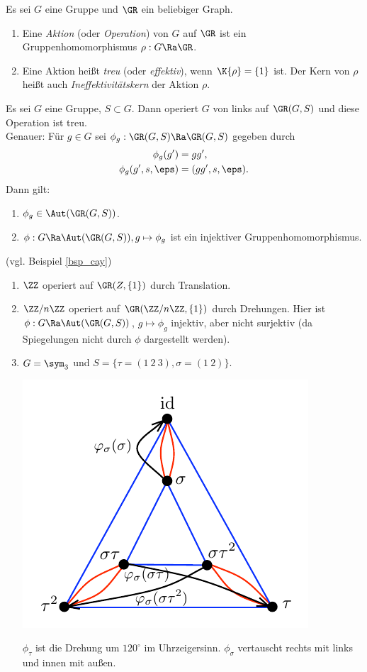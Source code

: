 \DB Es sei $G$ eine Gruppe und $\GR$ ein beliebiger Graph.
\begin{enumerate}
\item Eine \emph{Aktion} (oder \emph{Operation}) von $G$ auf $\GR$ ist ein
Gruppenhomomorphismus $\rho:G\Ra\GR$.
\item Eine Aktion heißt \emph{treu}
(oder \emph{effektiv}),
wenn $\K{\rho}=\{1\}$ ist. Der Kern von $\rho$ heißt auch
\emph{Ineffektivitätskern}
der Aktion $\rho$.
\end{enumerate}

\BEM Es sei $G$ eine Gruppe, $S\subset G$. Dann operiert $G$ von
links auf $\GR(G,S)$ und diese Operation ist treu.\\
Genauer: Für $g\in G$ sei $\phi_g:\GR(G,S)\Ra\GR(G,S)$ gegeben durch
\begin{align*}
\phi_g(g') &= gg', \\
\phi_g(g',s,\eps) &= (gg',s,\eps).
\end{align*}
Dann gilt:
\begin{enumerate}
\item $\phi_g \in \Aut(\GR(G,S))$.
\item $\phi:G\Ra\Aut(\GR(G,S)), g\mapsto \phi_g$ ist ein injektiver
Gruppenhomomorphismus.
\end{enumerate}

\BSP (vgl. Beispiel \ref{bsp_cay})
\begin{enumerate}
\item $\ZZ$ operiert auf $\GR(Z,\{1\})$ durch Translation.
\item $\ZZ/n\ZZ$ operiert auf $\GR(\ZZ/n\ZZ,\{1\})$ durch
Drehungen. Hier ist $\phi:G\Ra\Aut(\GR(G,S))$, $g\mapsto\phi_g$
injektiv, aber nicht surjektiv (da Spiegelungen nicht durch
$\phi$ dargestellt werden).
\item $G=\sym_3$ und $S=\{\tau=(1\ 2\ 3), \sigma=(1\ 2)\}$.
\begin{center}
	\includegraphics{grugraImages/S3aktion}
\end{center}
$\phi_{\tau}$ ist die Drehung um $120^{\circ}$ im
Uhrzeigersinn. $\phi_{\sigma}$ vertauscht rechts mit links und
innen mit außen.
\end{enumerate}

